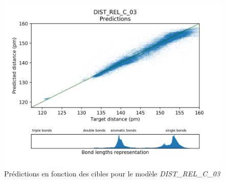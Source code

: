 \begin{figure}[!h]
	\centering
	
	\includegraphics[scale=0.8]{../figures/DIST_REL_C_03/DIST_REL_C_03_preds_targets.png}	
	
	\caption{Prédictions en fonction des cibles pour le modèle \emph{DIST\_REL\_C\_03}}
	
\end{figure}

